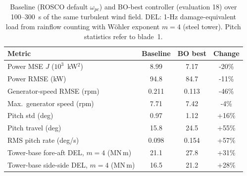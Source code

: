 \begin{table}[h]
\centering\small
\caption{Baseline (ROSCO default $\omega_{pc}$) and BO-best controller (evaluation 18) over 100--300~s of the same turbulent wind field. DEL: 1-Hz damage-equivalent load from rainflow counting with W\"ohler exponent $m=4$ (steel tower). Pitch statistics refer to blade~1.}
\label{tab:baseline_vs_best}
\begin{tabular}{lccc}
\hline
Metric & Baseline & BO best & Change \\
\hline
Power MSE $J$ ($10^3$~kW$^2$) & 8.99 & 7.17 & -20\% \\
Power RMSE (kW) & 94.8 & 84.7 & -11\% \\
Generator-speed RMSE (rpm) & 0.211 & 0.113 & -46\% \\
Max.\ generator speed (rpm) & 7.71 & 7.42 & -4\% \\
Pitch std (deg) & 0.97 & 1.12 & +16\% \\
Pitch travel (deg) & 15.8 & 24.5 & +55\% \\
RMS pitch rate (deg/s) & 0.098 & 0.154 & +57\% \\
Tower-base fore-aft DEL, $m=4$ (MN\,m) & 21.1 & 27.8 & +31\% \\
Tower-base side-side DEL, $m=4$ (MN\,m) & 16.5 & 21.2 & +28\% \\
\hline
\end{tabular}
\end{table}

